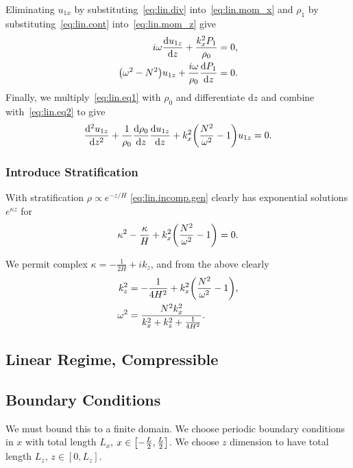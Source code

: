 \documentclass[11pt,
        usenames, %
        dvipsnames %
    ]{report}
\newcommand*{\rd}[2]{\frac{\mathrm{d}#1}{\mathrm{d}#2}}
\newcommand*{\rtd}[2]{\frac{\mathrm{d}^2#1}{\mathrm{d}#2^2}}
\DeclarePairedDelimiter\p{\lparen}{\rparen}
\DeclarePairedDelimiter\s{\lbrack}{\rbrack}
\begin{document}
Eliminating $u_{1x}$ by substituting~\eqref{eq:lin.div}
into~\eqref{eq:lin.mom_x} and $\rho_1$ by substituting~\eqref{eq:lin.cont}
into~\eqref{eq:lin.mom_z} give
\begin{subequations}
    \begin{align}
        i\omega \rd{u_{1z}}{z} + \frac{k_x^2 P_1}{\rho_0} &= 0,
            \label{eq:lin.eq1}\\
        \p*{\omega^2 - N^2 }u_{1z} + \frac{i\omega}{\rho_0}\rd{P_1}{z} &= 0.
            \label{eq:lin.eq2}
    \end{align}
\end{subequations}
Finally, we multiply~\eqref{eq:lin.eq1} with $\rho_0$ and differentiate
$\mathrm{d}z$ and combine with~\eqref{eq:lin.eq2} to give
\begin{equation}
    \rtd{u_{1z}}{z} + \frac{1}{\rho_0}\rd{\rho_0}{z}\rd{u_{1z}}{z}
        + k_x^2\p*{\frac{N^2}{\omega^2} - 1}u_{1z} = 0.\label{eq:lin.incomp.gen}
\end{equation}

\subsubsection{Introduce Stratification}

With stratification $\rho \propto e^{-z/H}$ \autoref{eq:lin.incomp.gen} clearly
has exponential solutions $e^{\kappa z}$ for
\begin{equation}
    \kappa^2 - \frac{\kappa}{H} + k_x^2\p*{\frac{N^2}{\omega^2} - 1} = 0.
\end{equation}

We permit complex $\kappa = -\frac{1}{2H} + ik_z$, and from the above clearly
\begin{align}
    k_z^2 &= -\frac{1}{4H^2} + k_x^2\p*{\frac{N^2}{\omega^2} - 1},\nonumber\\
    \omega^2 &= \frac{N^2k_x^2}{k_x^2 + k_z^2 + \frac{1}{4H^2}}.
\end{align}

\subsection{Linear Regime, Compressible}

\subsection{Boundary Conditions}

We must bound this to a finite domain. We choose periodic boundary conditions in
$x$ with total length $L_x$, $x \in \s*{-\frac{L}{2}, \frac{L}{2}}$. We choose
$z$ dimension to have total length $L_z$, $z \in [0, L_z]$.
\end{document}
